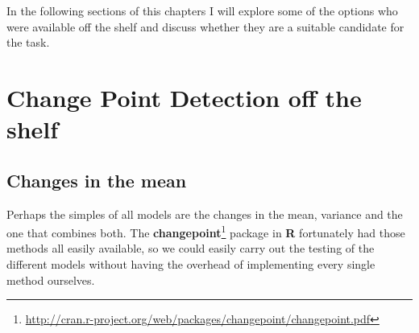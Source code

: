 \documentclass[minf,twoside,singlespacing,parskip,frontabs,notimes,12pt]{infthesis} %
\begin{document}
In the following sections of this chapters I will explore some of the options who were available off the shelf and discuss whether they are a suitable candidate for the task. 

\section{Change Point Detection off the shelf}

\subsection{Changes in the mean}
\label{sec:basic}

Perhaps the simples of all models are the changes in the mean, variance and the one that combines both. The \textbf{changepoint}\footnote{\url{http://cran.r-project.org/web/packages/changepoint/changepoint.pdf}} package in \textbf{R} fortunately had those methods all easily available, so we could easily carry out the testing of the different models without having the overhead of implementing every single method ourselves. 
\end{document}
